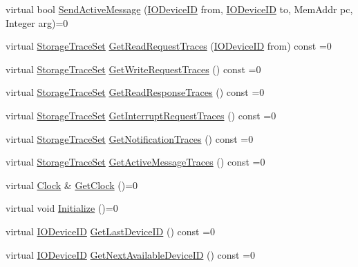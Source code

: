 \begin{DoxyCompactItemize}
\item 
virtual bool \hyperlink{class_simulator_1_1_i_i_o_bus_a4863c21b90d0126ee1c886f891c772a3}{Send\+Active\+Message} (\hyperlink{namespace_simulator_a3493d987c866ad6b8aaa704c42502db0}{I\+O\+Device\+I\+D} from, \hyperlink{namespace_simulator_a3493d987c866ad6b8aaa704c42502db0}{I\+O\+Device\+I\+D} to, Mem\+Addr pc, Integer arg)=0
\item 
virtual \hyperlink{class_simulator_1_1_storage_trace_set}{Storage\+Trace\+Set} \hyperlink{class_simulator_1_1_i_i_o_bus_aecf6e5f0da5be957ae517f8b5b6ea4ec}{Get\+Read\+Request\+Traces} (\hyperlink{namespace_simulator_a3493d987c866ad6b8aaa704c42502db0}{I\+O\+Device\+I\+D} from) const =0
\item 
virtual \hyperlink{class_simulator_1_1_storage_trace_set}{Storage\+Trace\+Set} \hyperlink{class_simulator_1_1_i_i_o_bus_a48ba2c4a49f95c368bc9432b953ffb06}{Get\+Write\+Request\+Traces} () const =0
\item 
virtual \hyperlink{class_simulator_1_1_storage_trace_set}{Storage\+Trace\+Set} \hyperlink{class_simulator_1_1_i_i_o_bus_a6dc2f2fbd325171f85fe06dfae09ce22}{Get\+Read\+Response\+Traces} () const =0
\item 
virtual \hyperlink{class_simulator_1_1_storage_trace_set}{Storage\+Trace\+Set} \hyperlink{class_simulator_1_1_i_i_o_bus_a16480612894d8510d0b03bf7ffc591d6}{Get\+Interrupt\+Request\+Traces} () const =0
\item 
virtual \hyperlink{class_simulator_1_1_storage_trace_set}{Storage\+Trace\+Set} \hyperlink{class_simulator_1_1_i_i_o_bus_a063b95f1813f8b297beebc2276a842e2}{Get\+Notification\+Traces} () const =0
\item 
virtual \hyperlink{class_simulator_1_1_storage_trace_set}{Storage\+Trace\+Set} \hyperlink{class_simulator_1_1_i_i_o_bus_a35fd77c2eebd5b128009e47e9986f016}{Get\+Active\+Message\+Traces} () const =0
\item 
virtual \hyperlink{class_simulator_1_1_clock}{Clock} \& \hyperlink{class_simulator_1_1_i_i_o_bus_a0355ff5fd84e363f08d169373ca068df}{Get\+Clock} ()=0
\item 
virtual void \hyperlink{class_simulator_1_1_i_i_o_bus_a18ac464d5eaadee9cdc9b44205fb9678}{Initialize} ()=0
\item 
virtual \hyperlink{namespace_simulator_a3493d987c866ad6b8aaa704c42502db0}{I\+O\+Device\+I\+D} \hyperlink{class_simulator_1_1_i_i_o_bus_a7fd98d356ee3ed5df0445ceeb9e5d196}{Get\+Last\+Device\+I\+D} () const =0
\item 
virtual \hyperlink{namespace_simulator_a3493d987c866ad6b8aaa704c42502db0}{I\+O\+Device\+I\+D} \hyperlink{class_simulator_1_1_i_i_o_bus_ad52f98ce0c8b13155b7f91636fddfcc0}{Get\+Next\+Available\+Device\+I\+D} () const =0

\end{DoxyCompactItemize}
